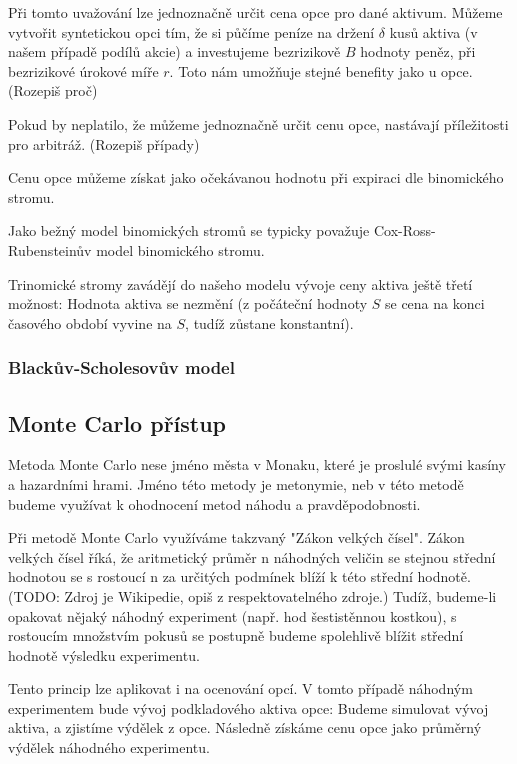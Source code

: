 \documentclass{article}
\begin{document}
  Při tomto uvažování lze jednoznačně určit cena opce pro dané aktivum. Můžeme vytvořit syntetickou opci tím, že si půčíme peníze na držení $\delta$ kusů aktiva (v našem případě podílů akcie) a investujeme bezrizikově $B$ hodnoty peněz, při bezrizikové úrokové míře $r$. Toto nám umožňuje stejné benefity jako u opce. (Rozepiš proč)

  Pokud by neplatilo, že můžeme jednoznačně určit cenu opce, nastávají příležitosti pro arbitráž. (Rozepiš případy)

  Cenu opce můžeme získat jako očekávanou hodnotu při expiraci dle binomického stromu.

  Jako bežný model binomických stromů se typicky považuje Cox-Ross-Rubensteinův model binomického stromu.

  Trinomické stromy zavádějí do našeho modelu vývoje ceny aktiva ještě třetí možnost: Hodnota aktiva se nezmění (z počáteční hodnoty $S$ se cena na konci časového období vyvine na $S$, tudíž zůstane konstantní). 

  \subsubsection{Blackův-Scholesovův model}


  \subsection{Monte Carlo přístup}

  Metoda Monte Carlo nese jméno města v Monaku, které je proslulé svými kasíny a hazardními hrami. Jméno této metody je metonymie, neb v této metodě budeme využívat k ohodnocení metod náhodu a pravděpodobnosti.

  Při metodě Monte Carlo využíváme takzvaný "Zákon velkých čísel". Zákon velkých čísel říká, že aritmetický průměr n náhodných veličin se stejnou střední hodnotou se s rostoucí n za určitých podmínek blíží k této střední hodnotě. (TODO: Zdroj je Wikipedie, opiš z respektovatelného zdroje.) Tudíž, budeme-li opakovat nějaký náhodný experiment (např. hod šestistěnnou kostkou), s rostoucím množstvím pokusů se postupně budeme spolehlivě blížit střední hodnotě výsledku experimentu.

  Tento princip lze aplikovat i na ocenování opcí. V tomto případě náhodným experimentem bude vývoj podkladového aktiva opce: Budeme simulovat vývoj aktiva, a zjistíme výdělek z opce. Následně získáme cenu opce jako průměrný výdělek náhodného experimentu.
\end{document}
